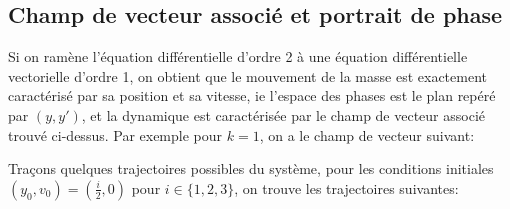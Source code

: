    \subsection{Champ de vecteur associé et portrait de phase}
      Si on ramène l'équation différentielle d'ordre 2 à une équation différentielle vectorielle d'ordre 1, on obtient que le mouvement de la masse est exactement caractérisé par sa position et sa vitesse, ie l'espace des phases est le plan repéré par \((y, y')\), et la dynamique est caractérisée par le champ de vecteur associé trouvé ci-dessus. Par exemple pour \(k = 1\), on a le champ de vecteur suivant:
      \begin{center}
      \end{center}

      \pagebreak
      
      Traçons quelques trajectoires possibles du système, pour les conditions initiales \((y_0, v_0) = (\frac{i}{2}, 0)\) pour \(i \in \{1, 2, 3\}\), on trouve les trajectoires suivantes:

